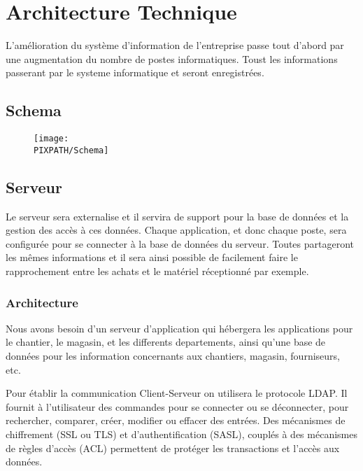 \documentclass [a4paper] {report}
\begin{document}
\section{Architecture Technique}
L’amélioration du système d’information de l’entreprise passe tout d’abord par une augmentation du nombre de postes
informatiques. Toust les informations passerant par le systeme informatique et seront enregistrées.

\subsection{Schema}

 \begin{figure}[!h]
    \begin{center}
    \texttt{[image: \\PIXPATH/Schema]}
    \caption{}
    \end{center}
    \end{figure}


\subsection{Serveur}

Le serveur sera externalise et il servira de support pour la base de données et la gestion des accès à ces données. 
Chaque application, et donc chaque poste, sera configurée pour se connecter à la base de données du serveur. Toutes partageront les mêmes informations et il sera ainsi possible de facilement faire le rapprochement entre les achats et le matériel réceptionné par exemple.

	\subsubsection{Architecture}
Nous avons besoin d'un serveur d'application qui hébergera les applications pour le chantier, le magasin, et les differents 
departements,  ainsi qu'une base de données pour les information concernants aux chantiers, magasin, fourniseurs, etc. 

Pour établir la communication Client-Serveur on utilisera le protocole LDAP. Il fournit à l'utilisateur des commandes 
pour se connecter ou se déconnecter,  pour rechercher, comparer, créer, modifier ou effacer des entrées. Des mécanismes de chiffrement (SSL ou TLS) et d'authentification (SASL), couplés à des mécanismes de règles d'accès (ACL) permettent de protéger les transactions et l'accès aux données.
\end{document}

